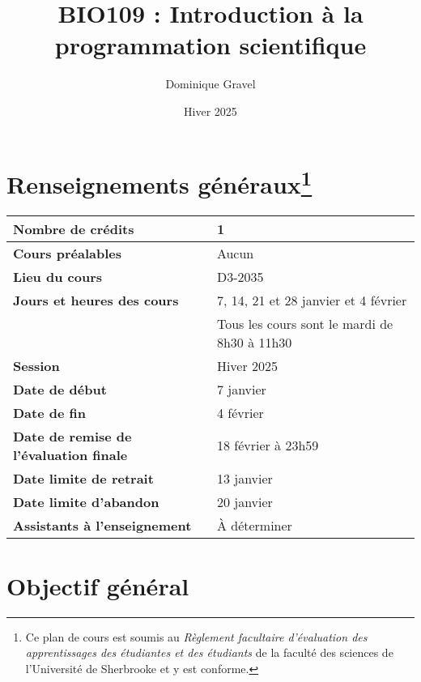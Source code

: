 \documentclass[12]{article}
\title{BIO109 : Introduction à la programmation scientifique}
\date {Hiver 2025}
\author {Dominique Gravel}
\affil {Département de biologie \\
        Université de Sherbrooke \\
        Local D8-3066 \\
        819-821-8000 \#66589}
\affil {\url{dominique.gravel@usherbrooke.ca}}
\begin{document}
	\maketitle

	\section*{Renseignements généraux\footnote{Ce plan de cours est soumis au \textit{Règlement facultaire d'évaluation des apprentissages des étudiantes et des étudiants} de la faculté des sciences de l'Université de Sherbrooke et y est conforme.}} 
        
        \begin{center}
        \begin{tabular}{ m{22em} m{24em} } 
         \hline
         \hline
         \textbf{Nombre de crédits} & 1 \\ 
         \hline
         \textbf{Cours préalables} & Aucun \\
         \hline
         \textbf{Lieu du cours} & D3-2035 \\
         \hline
         \textbf{Jours et heures des cours} & 7, 14, 21 et 28 janvier et 4 février \\ & Tous les cours sont le mardi de 8h30 à 11h30 \\
         \hline
         \textbf{Session} & Hiver 2025 \\
         \hline
         \textbf{Date de début} & 7 janvier \\
         \hline
         \textbf{Date de fin} & 4 février \\
         \hline
         \textbf{Date de remise de l'évaluation finale} & 18 février à 23h59 \\
         \hline
         \textbf{Date limite de retrait} & 13 janvier \\
         \hline
         \textbf{Date limite d'abandon} & 20 janvier \\
         \hline
         \textbf{Assistants à l'enseignement} & À déterminer \\
         \hline
         \hline
        \end{tabular}
        \end{center}
	
	\section*{Objectif général}
\end{document}
